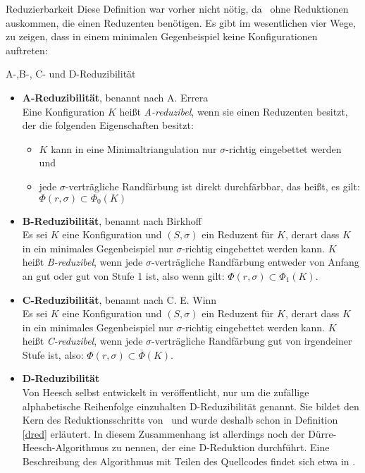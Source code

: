 \begin{section}{Reduzierbarkeit}
 Diese Definition war vorher nicht nötig, da \rsst\-\ ohne Reduktionen auskommen, die einen Reduzenten benötigen. Es gibt im wesentlichen vier Wege, zu zeigen, dass in einem minimalen Gegenbeispiel keine Konfigurationen auftreten:
 
 \begin{definition}{A-,B-, C- und D-Reduzibilität}
 \-\ 
  \begin{itemize}
   \item \textbf{A-Reduzibilität}, benannt nach A. Errera\\
   Eine Konfiguration $K$ heißt \textit{A-reduzibel}, wenn sie einen Reduzenten besitzt, der die folgenden Eigenschaften besitzt:
   \begin{itemize}
    \item $K$ kann in eine Minimaltriangulation nur $\sigma$-richtig eingebettet werden und
    \item jede $\sigma$-verträgliche Randfärbung ist direkt durchfärbbar, das heißt, es gilt: $\Phi(r,\sigma) \subset \Phi_0(K)$
   \end{itemize}
   \item \textbf{B-Reduzibilität}, benannt nach Birkhoff\\
   Es sei $K$ eine Konfiguration und $(S,\sigma)$ ein Reduzent für $K$, derart dass $K$ in ein minimales Gegenbeispiel nur $\sigma$-richtig eingebettet werden kann. $K$ heißt \textit{B-reduzibel}, wenn jede $\sigma$-verträgliche Randfärbung entweder von Anfang an gut oder gut von Stufe 1 ist, also wenn gilt: $\Phi(r,\sigma)\subset\Phi_1(K)$.
   \item \textbf{C-Reduzibilität}, benannt nach C. E. Winn\\
   Es sei $K$ eine Konfiguration und $(S,\sigma)$ ein Reduzent für $K$, derart dass $K$ in ein minimales Gegenbeispiel nur $\sigma$-richtig eingebettet werden kann. $K$ heißt \textit{C-reduzibel}, wenn jede $\sigma$-verträgliche Randfärbung gut von irgendeiner Stufe ist, also: $\Phi(r,\sigma) \subset \overline{\Phi}(K)$.
   \item \textbf{D-Reduzibilität}\\
   Von Heesch selbst entwickelt in \cite{heesch} veröffentlicht, nur um die zufällige alphabetische Reihenfolge einzuhalten D-Reduzibilität genannt. Sie bildet den Kern  des Reduktionsschritts von \rsst\-\ und wurde deshalb schon in Definition \ref{dred} erläutert. In diesem Zusammenhang ist allerdings noch der Dürre-Heesch-Algorithmus zu nennen, der eine D-Reduktion durchführt. Eine Beschreibung des Algorithmus mit Teilen des Quellcodes findet sich etwa in \cite[Kapitel 6.4]{fritsch}.
  \end{itemize}
 \end{definition}


\end{section}
